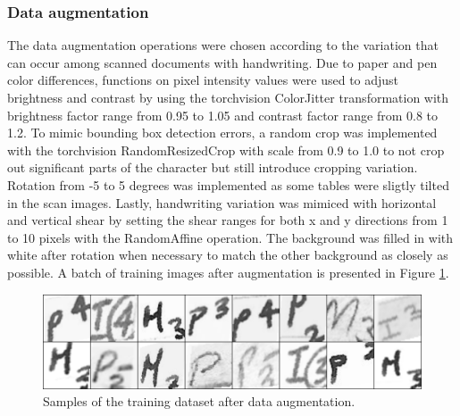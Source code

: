 \documentclass{article}
\begin{document}
\subsubsection{Data augmentation}

The data augmentation operations were chosen according to the variation that can 
occur among scanned documents with handwriting.
Due to paper and pen color differences, functions on pixel intensity
values were used to adjust brightness and contrast by using the 
torchvision ColorJitter transformation with brightness factor range from 
0.95 to 1.05 and contrast factor range from 0.8 to 1.2. To mimic bounding box detection errors, 
a random crop was implemented with the torchvision RandomResizedCrop with 
scale from 0.9 to 1.0 to not crop out significant parts of the character but 
still introduce cropping variation. Rotation from -5 to 5 degrees 
was implemented as some tables were sligtly tilted in the scan images. 
Lastly, handwriting variation was mimiced with horizontal and vertical 
shear by setting the shear ranges for both x and y directions from 1 
to 10 pixels with the RandomAffine operation. The background was filled in 
with white after rotation when necessary to match the other background as closely as possible.
 A batch of training images after augmentation
is presented in Figure \ref{image:augmented}.

\begin{figure}[h]
    \centering
    \includegraphics*[scale=.2]{../images/augmented.png}
    \caption{Samples of the training dataset after data augmentation.}
    \label{image:augmented}
\end{figure}
\end{document}
